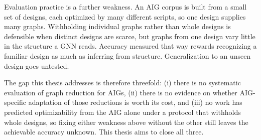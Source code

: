 Evaluation practice is a further weakness. An AIG corpus is built from a small set of
designs, each optimized by many different scripts, so one design supplies many graphs.
Withholding individual graphs rather than whole designs is defensible when distinct designs
are scarce, but graphs from one design vary little in the structure a GNN reads. Accuracy
measured that way rewards recognizing a familiar design as much as inferring from structure.
Generalization to an unseen design goes untested.

The gap this thesis addresses is therefore threefold: (i) there is no systematic evaluation
of graph reduction for AIGs, (ii) there is no evidence on whether AIG-specific adaptation of
those reductions is worth its cost, and (iii) no work has predicted optimizability from the
AIG alone under a protocol that withholds whole designs, so fixing either weakness above
without the other still leaves the achievable accuracy unknown. This thesis aims to close
all three.
